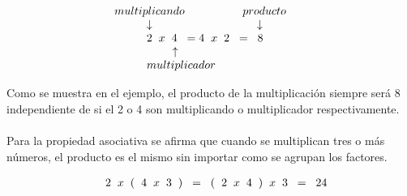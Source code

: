 \documentclass[10pt,journal,compsoc]{IEEEtran}
\begin{document}
\begin{center}
\[
\begin{array}{rl l}
&  \hspace{-1cm} multiplicando \hspace{1.8cm} producto \\
& \downarrow \hspace{3.25cm} \downarrow \\
& 2 \hspace{0.2cm} x \hspace{0.2cm} 4 \hspace{0.2cm} = 4 \hspace{0.2cm} x \hspace{0.2cm} 2 \hspace{0.2cm} = \hspace{0.2cm} 8 \\
& \hspace{0.8cm} \uparrow \\
& multiplicador \\
\end{array}
\]
\end{center}

Como se muestra en el ejemplo, el producto de la multiplicación siempre será 8 independiente de si el 2 o 4 son multiplicando o multiplicador respectivamente.
\\\\
Para la propiedad asociativa se afirma que cuando se multiplican tres o más números, el producto es el mismo sin importar como se agrupan los factores.

\begin{center}
\[
\begin{array}{rl l}
& 2 \hspace{0.2cm} x \hspace{0.2cm} ( \hspace{0.2cm} 4 \hspace{0.2cm} x \hspace{0.2cm} 3 \hspace{0.2cm} ) \hspace{0.2cm} = \hspace{0.2cm} ( \hspace{0.2cm} 2 \hspace{0.2cm} x \hspace{0.2cm} 4 \hspace{0.2cm} ) \hspace{0.2cm} x \hspace{0.2cm} 3 \hspace{0.2cm} = \hspace{0.2cm} 24 \\
\end{array}
\]
\end{center}
\end{document}
